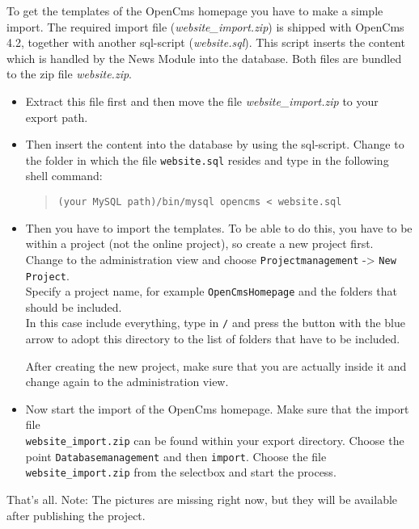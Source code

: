 To get the templates of the OpenCms homepage you have to make a simple import.
The required import file (\textit{website\_import.zip}) is shipped with OpenCms 4.2,
together with another sql-script (\textit{website.sql}). This script inserts the content
which is handled by the News Module into the database.
Both files are bundled to the zip file \textit{website.zip}.

\begin{itemize}
\item
Extract this file first and then move the file \textit{website\_import.zip} to your
export path.

\item
Then insert the content into the database by using the sql-script.
Change to the folder in which the file
\texttt{website.sql} resides and type in the following shell command:

\begin{quote}
\texttt{(your MySQL path)/bin/mysql opencms < website.sql}
\end{quote}

\item
Then you have to import the templates.
To be able to do this, you have to be within a project
(not the online project), so create a new
project first. \\
Change to the administration view and choose \texttt{Projectmanagement}
-> \texttt{New Project}.\\ 
Specify a project name, for example \texttt{OpenCmsHomepage} and the folders that
should be included. \\
In this case include everything, type in \texttt{/} and press
the button with the blue arrow to adopt this directory to the list of folders that
have to be included.

After creating the new project, make sure that you are actually inside it and
change again to the administration view. 

\item
Now start the import of the OpenCms homepage. 
Make sure that the import file \\
\texttt{website\_import.zip} can be found within your
export directory.
Choose the point \texttt{Databasemanagement} and then \texttt{import}.
Choose the file \texttt{website\_import.zip} from the selectbox and start the process.

\end{itemize}
That's all.
Note: The pictures are missing right now, but they will be available after
publishing the project.

